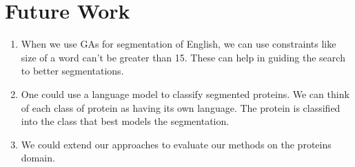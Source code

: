 \documentclass[runningheads]{llncs}
\begin{document}
\section{Future Work}
\begin{enumerate}
    \item When we use GAs for segmentation of English, we can use constraints like size of a word can't be greater than 15. These can help in guiding the search to better segmentations.
    \item One could use a language model to classify segmented proteins. We can think of each class of protein as having its own language. The protein is classified into the class that best models the segmentation.
    \item We could extend our approaches to evaluate our methods on the proteins domain.
\end{enumerate}




%
%
%



\end{document}
